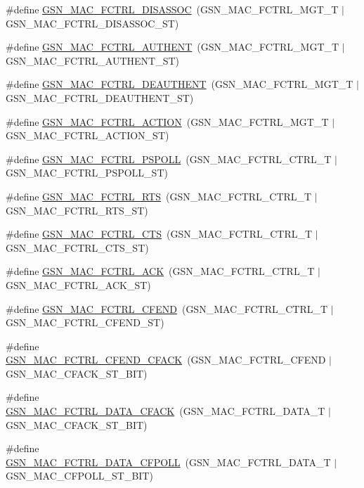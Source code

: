 \begin{DoxyCompactItemize}
\#define \hyperlink{a00523_aaf588544c26714a339e10e893ec9fd57}{GSN\_\-MAC\_\-FCTRL\_\-DISASSOC}~(GSN\_\-MAC\_\-FCTRL\_\-MGT\_\-T     $|$ GSN\_\-MAC\_\-FCTRL\_\-DISASSOC\_\-ST)
\item 
\#define \hyperlink{a00523_a84f057e939079aea7b655edfdbde4850}{GSN\_\-MAC\_\-FCTRL\_\-AUTHENT}~(GSN\_\-MAC\_\-FCTRL\_\-MGT\_\-T     $|$ GSN\_\-MAC\_\-FCTRL\_\-AUTHENT\_\-ST)
\item 
\#define \hyperlink{a00523_a4afc6b18a2a73d74e849c37d86c5d93a}{GSN\_\-MAC\_\-FCTRL\_\-DEAUTHENT}~(GSN\_\-MAC\_\-FCTRL\_\-MGT\_\-T     $|$ GSN\_\-MAC\_\-FCTRL\_\-DEAUTHENT\_\-ST)
\item 
\#define \hyperlink{a00523_a9df1a14fcd52f64a68a10dda41a06884}{GSN\_\-MAC\_\-FCTRL\_\-ACTION}~(GSN\_\-MAC\_\-FCTRL\_\-MGT\_\-T     $|$ GSN\_\-MAC\_\-FCTRL\_\-ACTION\_\-ST)
\item 
\#define \hyperlink{a00523_a0919c93de1959e718fe29eb6fbc1ef94}{GSN\_\-MAC\_\-FCTRL\_\-PSPOLL}~(GSN\_\-MAC\_\-FCTRL\_\-CTRL\_\-T    $|$ GSN\_\-MAC\_\-FCTRL\_\-PSPOLL\_\-ST)
\item 
\#define \hyperlink{a00523_ae3e4aa31cd1c03793be65a270b017817}{GSN\_\-MAC\_\-FCTRL\_\-RTS}~(GSN\_\-MAC\_\-FCTRL\_\-CTRL\_\-T    $|$ GSN\_\-MAC\_\-FCTRL\_\-RTS\_\-ST)
\item 
\#define \hyperlink{a00523_a7c226906bac26ada2865cbc09c08a85b}{GSN\_\-MAC\_\-FCTRL\_\-CTS}~(GSN\_\-MAC\_\-FCTRL\_\-CTRL\_\-T    $|$ GSN\_\-MAC\_\-FCTRL\_\-CTS\_\-ST)
\item 
\#define \hyperlink{a00523_aad493db6e34af587bb101e7e9a5439eb}{GSN\_\-MAC\_\-FCTRL\_\-ACK}~(GSN\_\-MAC\_\-FCTRL\_\-CTRL\_\-T    $|$ GSN\_\-MAC\_\-FCTRL\_\-ACK\_\-ST)
\item 
\#define \hyperlink{a00523_a62200880bced535be7cb6c27175d42a4}{GSN\_\-MAC\_\-FCTRL\_\-CFEND}~(GSN\_\-MAC\_\-FCTRL\_\-CTRL\_\-T    $|$ GSN\_\-MAC\_\-FCTRL\_\-CFEND\_\-ST)
\item 
\#define \hyperlink{a00523_a140e74f226cbcdad957aebdb7c74a143}{GSN\_\-MAC\_\-FCTRL\_\-CFEND\_\-CFACK}~(GSN\_\-MAC\_\-FCTRL\_\-CFEND     $|$ GSN\_\-MAC\_\-CFACK\_\-ST\_\-BIT)
\item 
\#define \hyperlink{a00523_a8939fd8ec06bdbf55fb5879bd9302600}{GSN\_\-MAC\_\-FCTRL\_\-DATA\_\-CFACK}~(GSN\_\-MAC\_\-FCTRL\_\-DATA\_\-T    $|$ GSN\_\-MAC\_\-CFACK\_\-ST\_\-BIT)
\item 
\#define \hyperlink{a00523_a411680124b2b73dd7f2c6e19ebdf8783}{GSN\_\-MAC\_\-FCTRL\_\-DATA\_\-CFPOLL}~(GSN\_\-MAC\_\-FCTRL\_\-DATA\_\-T    $|$ GSN\_\-MAC\_\-CFPOLL\_\-ST\_\-BIT)
\item 

\end{DoxyCompactItemize}
